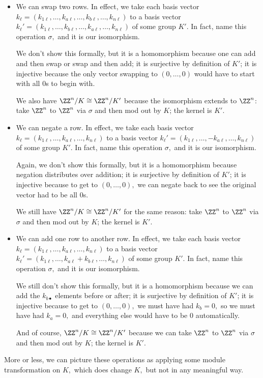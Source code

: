 \begin{itemize}
    \item We can swap two rows. In effect, we take each basis vector $k_\ell=(k_{1\ell},\ldots,k_{a\ell},\ldots,k_{b\ell},\ldots,k_{n\ell})$ to a basis vector $k_\ell'=(k_{1\ell},\ldots,k_{b\ell},\ldots,k_{a\ell},\ldots,k_{n\ell})$ of some group $K'.$ In fact, name this operation $\sigma,$ and it is our isomorphism.
    
    We don't show this formally, but it is a homomorphism because one can add and then swap or swap and then add; it is surjective by definition of $K'$; it is injective because the only vector swapping to $(0,\ldots,0)$ would have to start with all $0$s to begin with.
    
    We also have $\ZZ^n/K\cong\ZZ^n/K'$ because the isomorphism extends to $\ZZ^n$: take $\ZZ^n$ to $\ZZ^n$ via $\sigma$ and then mod out by $K$; the kernel is $K'.$
    \item We can negate a row. In effect, we take each basis vector $k_\ell=(k_{1\ell},\ldots,k_{a\ell},\ldots,k_{n\ell})$ to a basis vector $k_\ell'=(k_{1\ell},\ldots,-k_{a\ell},\ldots,k_{n\ell})$ of some group $K'.$ In fact, name this operation $\sigma,$ and it is our isomorphism.
    
    Again, we don't show this formally, but it is a homomorphism because negation distributes over addition; it is surjective by definition of $K'$; it is injective because to get to $(0,\ldots,0),$ we can negate back to see the original vector had to be all $0$s.
    
    We still have $\ZZ^n/K\cong\ZZ^n/K'$ for the same reason: take $\ZZ^n$ to $\ZZ^n$ via $\sigma$ and then mod out by $K$; the kernel is $K'.$
    \item We can add one row to another row. In effect, we take each basis vector $k_\ell=(k_{1\ell},\ldots,k_{a\ell},\ldots,k_{n\ell})$ to a basis vector $k_\ell'=(k_{1\ell},\ldots,k_{a\ell}+k_{b\ell},\ldots,k_{n\ell})$ of some group $K'.$ In fact, name this operation $\sigma,$ and it is our isomorphism.
    
    We still don't show this formally, but it is a homomorphism because we can add the $k_{b\bullet}$ elements before or after; it is surjective by definition of $K'$; it is injective because to get to $(0,\ldots,0),$ we must have had $k_b=0,$ so we must have had $k_a=0,$ and everything else would have to be $0$ automatically.
    
    And of course, $\ZZ^n/K\cong\ZZ^n/K'$ because we can take $\ZZ^n$ to $\ZZ^n$ via $\sigma$ and then mod out by $K$; the kernel is $K'.$
\end{itemize}
More or less, we can picture these operations as applying some module transformation on $K,$ which does change $K,$ but not in any meaningful way.

